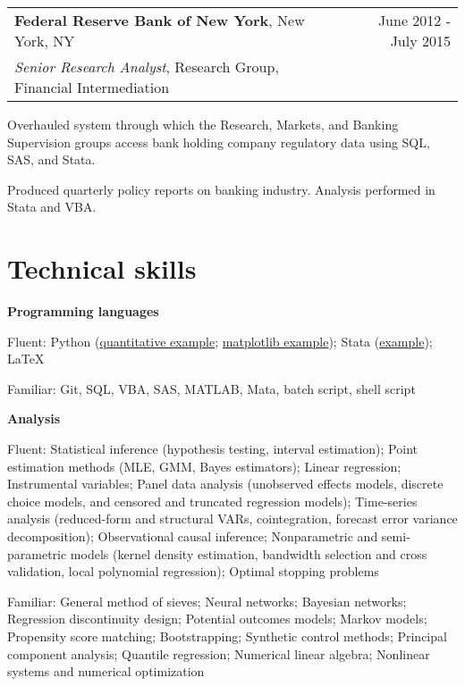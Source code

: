 \documentclass[10pt]{article}
\newcommand{\mysep}{\vspace{4pt}}
\begin{document}
\mysep{}
\begin{tabularx}{\textwidth}{LR}
\textbf{Federal Reserve Bank of New York}, New York, NY
& June 2012 - July 2015 
\\
\emph{Senior Research Analyst}, Research Group, Financial Intermediation
\end{tabularx}
\begin{blist}
\item Overhauled system through which the Research, Markets, and Banking Supervision groups access bank holding company regulatory data using SQL, SAS, and Stata. 
\item Produced quarterly policy reports on banking industry. Analysis performed in Stata and VBA. 
\end{blist}

\mysep{}
\section*{Technical skills}

\textbf{Programming languages}
\begin{blist}
\item Fluent: Python
  (\href{https://github.com/tara-sullivan/hcs/blob/master/hcs/model/afmodel.py}{quantitative example}; 
  \href{https://github.com/tara-sullivan/hcs/blob/master/hcs/img/code/plot_line_labels.py}{matplotlib example}); Stata (\href{https://github.com/tara-sullivan/hcs/blob/master/hcs/data/ipeds/c/clean_data/ipeds_c_clean.do}{example}); \LaTeX

\item Familiar: Git, SQL, VBA, SAS, MATLAB, Mata, batch script, shell script
\end{blist}

\mysep{}
\textbf{Analysis}
\begin{blist}
\item Fluent:
Statistical inference (hypothesis testing, interval estimation);
Point estimation methods (MLE, GMM, Bayes estimators);
Linear regression;
Instrumental variables;
Panel data analysis (unobserved effects models, discrete choice models, and censored and truncated regression models);
Time-series analysis (reduced-form and structural VARs, cointegration, forecast error variance decomposition);
Observational causal inference;
Nonparametric and semi-parametric models (kernel density estimation, bandwidth selection and cross validation, local polynomial regression);
Optimal stopping problems

\item Familiar: 
General method of sieves;
Neural networks;
Bayesian networks;
Regression discontinuity design;
Potential outcomes models;
Markov models;
Propensity score matching; 
Bootstrapping;
Synthetic control methods; 
Principal component analysis;
Quantile regression;
Numerical linear algebra;
Nonlinear systems and numerical optimization 
\end{blist}
\end{document}
